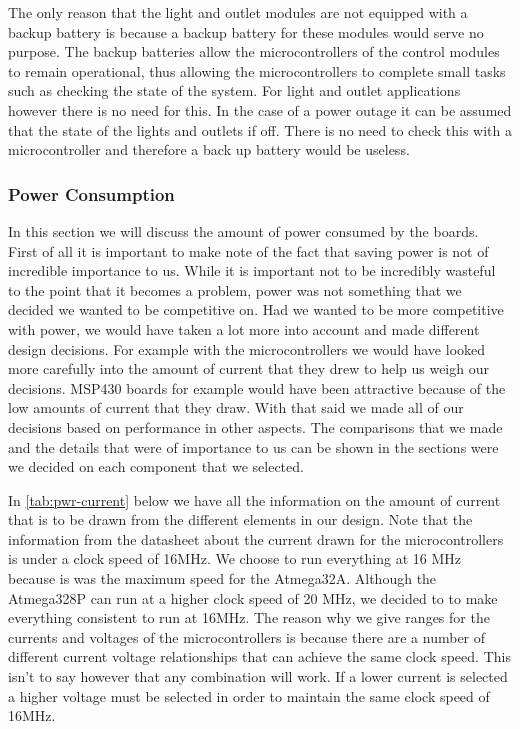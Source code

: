 
The only reason that the light and outlet modules are not
equipped with a backup battery is because a backup battery for these modules
would serve no purpose. The backup batteries allow the microcontrollers of
the control modules to remain operational, thus allowing the microcontrollers
to complete small tasks such as checking the state of the system. For light
and outlet applications however there is no need for this. In the case of a
power outage it can be assumed that the state of the lights and outlets if
off. There is no need to check this with a microcontroller and therefore a back
up battery would be useless.

\subsubsection{Power Consumption}
\label{sec:power-consumption}
In this section we will discuss the amount of power consumed by the boards.
First of all it is important to make note of the fact that saving power is not
of incredible importance to us. While it is important not to be incredibly
wasteful to the point that it becomes a problem, power was not something that
we decided we wanted to be competitive on. Had we wanted to be more competitive
with power, we would have taken a lot more into account and made different
design decisions. For example with the microcontrollers we would have looked
more carefully into the amount of current that they drew to help us weigh our
decisions. MSP430 boards for example would have been attractive because of the
low amounts of current that they draw. With that said we made all of our
decisions based on performance in other aspects.  The comparisons that we made
and the details that were of importance to us can be shown in the sections were
we decided on each component that we selected.

In \autoref{tab:pwr-current} below we have all the information on the amount of
current that is to be drawn from the different elements in our design. Note
that the information from the datasheet about the current drawn for the
microcontrollers is under a clock speed of 16MHz. We choose to run everything
at 16 MHz because is was the maximum speed for the Atmega32A. Although the
Atmega328P can run at a higher clock speed of 20 MHz, we decided to to make
everything consistent to run at 16MHz. The reason why we give ranges for the
currents and voltages of the microcontrollers is because there are a number of
different current voltage relationships that can achieve the same clock speed.
This isn{}'t to say however that any combination will work. If a lower current
is selected a higher voltage must be selected in order to maintain the same
clock speed of 16MHz.

